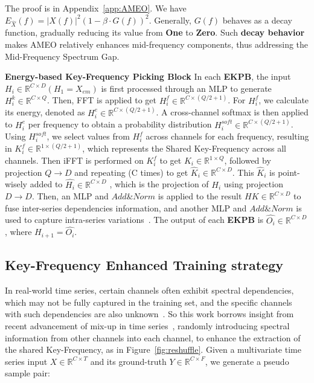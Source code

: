The proof is in Appendix~\ref{app:AMEO}. We have $E_{\hat{X}}(f) =|X(f)|^2(1-\beta  \cdot G(f))^2$. Generally, $ G(f) $ behaves as a decay function, gradually reducing its value from \textbf{One} to \textbf{Zero}. Such \textbf{decay behavior} makes AMEO relatively enhances mid-frequency components, thus addressing the Mid-Frequency Spectrum Gap.

\textbf{Energy-based Key-Frequency Picking Block \quad} In each \textbf{EKPB}, the input $ H_i \in \mathbb{R}^{C  \times D} (H_1=X_{em}) $ is first processed through an MLP to generate $ H_i^k \in \mathbb{R}^{C  \times Q}$. Then, FFT is applied to get $ H_i^f \in \mathbb{R}^{C  \times (Q/2+1)}$. For $ H_i^f$, we calculate its energy, denoted as $ H_i^e \in \mathbb{R}^{C  \times (Q/2+1)}$. A cross-channel softmax is then applied to $ H_i^e$ per frequency to obtain a probability distribution $ H_i^{soft} \in \mathbb{R}^{C  \times (Q/2+1)}$. Using $H_i^{soft}$, we select values from $ H_i^f$ across channels for each frequency, resulting in $K^f_i \in \mathbb{R}^{1  \times (Q/2+1)}$, which represents the Shared Key-Frequency across all channels. Then iFFT is performed on $K^f_i$ to get $K_i\in \mathbb{R}^{1  \times Q}$, followed by projection $Q\rightarrow D$ and repeating (C times) to get $\hat{K}_i \in \mathbb{R}^{C  \times D}$. This $\hat{K}_i$ is point-wisely added to $\hat{H_i}\in \mathbb{R}^{C  \times D}$ , which is the projection of $ H_i$ using projection $D\rightarrow D$. Then, an MLP and $Add\&Norm$ is applied to the result $HK\in \mathbb{R}^{C  \times D}$ to fuse inter-series dependencies information, and another MLP and $Add\&Norm$ is used to capture intra-series variations~\citep{LiuiTransformer}. The output of each \textbf{EKPB} is $\hat{O_i} \in \mathbb{R}^{C  \times D}$, where $H_{i+1}=\hat{O_i}$.

\subsection{Key-Frequency Enhanced Training strategy}

In real-world time series, certain channels often exhibit spectral dependencies, which may not be fully captured in the training set, and the specific channels with such dependencies are also unknown~\citep{geweke1984freqchannel,Zhao2024freqchannel}. So this work borrows insight from recent advancement of mix-up in time series~\citep{zhou2023mixup,ansari2024mixup}, randomly introducing spectral information from other channels into each channel, to enhance the extraction of the shared Key-Frequency, as in Figure~\ref{fig:reshuffle}. Given a multivariate time series input $X \in \mathbb{R}^{C \times T}$ and its ground-truth $Y \in \mathbb{R}^{C \times F}$, we generate a pseudo sample pair: 

